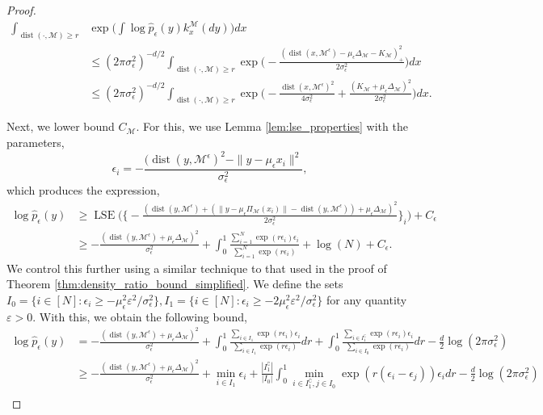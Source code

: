 \documentclass[10pt]{article}
\theoremstyle{plain}
\theoremstyle{definition}
\theoremstyle{remark}
\newcommand{\M}{{\mathcal{M}}}
\newcommand{\lse}{\operatorname{LSE}}
\newcommand{\dist}{\operatorname{dist}}
\newcommand{\gap}{\Delta_\M}
\begin{document}
\begin{proof}
\begin{align}
    \int_{\dist(\cdot, \M) \geq r} & \exp \bigg ( \int \log \hat{p}_\epsilon(y) k_x^\M(dy) \bigg ) dx \nonumber\\
    &\leq (2 \pi \sigma_\epsilon^2)^{-d/2} \int_{\dist(\cdot, \M) \geq r} \exp \bigg ( - \frac{(\dist(x, \M^\epsilon) - \mu_\epsilon \gap - K_\M)_+^2}{2 \sigma_\epsilon^2} \bigg ) dx \nonumber\\
    &\leq (2 \pi \sigma_\epsilon^2)^{-d/2} \int_{\dist(\cdot, \M) \geq r} \exp \bigg ( - \frac{\dist(x, \M^\epsilon)^2}{4\sigma_\epsilon^2} + \frac{(K_\M + \mu_\epsilon \gap)^2}{2\sigma_\epsilon^2} \bigg ) dx.\label{eq:man_conc_simple_5}
\end{align}

Next, we lower bound \(C_\M\). For this, we use Lemma \ref{lem:lse_properties} with the parameters,
\begin{equation*}
    \epsilon_i = -\frac{(\dist(y, \M^\epsilon)^2 - \|y - \mu_\epsilon x_i\|^2}{\sigma_\epsilon^2},
\end{equation*}
which produces the expression,
\begin{align*}
    \log \hat{p}_\epsilon(y) &\geq\lse \bigg ( \bigg \{ - \frac{(\dist(y, \M^\epsilon) + (\|y - \mu_\epsilon \Pi_\M(x_i)\|-\dist(y, \M^\epsilon)) + \mu_\epsilon \gap)^2}{2\sigma_\epsilon^2} \bigg \}_i \bigg ) + C_\epsilon\\
    &\geq -\frac{(\dist(y, \M^\epsilon) + \mu_\epsilon \gap)^2}{\sigma_\epsilon^2} + \int_0^1 \frac{\sum_{i=1}^N\exp(r\epsilon_i)\epsilon_i}{\sum_{i=1}^N \exp(r\epsilon_i)} + \log(N) + C_\epsilon.
\end{align*}
We control this further using a similar technique to that used in the proof of Theorem \ref{thm:density_ratio_bound_simplified}. We define the sets \(I_0 = \{i \in [N]: \epsilon_i \geq -\mu_\epsilon^2 \varepsilon^2/\sigma_\epsilon^2\}, I_1 = \{i \in [N]: \epsilon_i \geq -2\mu_\epsilon^2\varepsilon^2/\sigma_\epsilon^2\}\) for any quantity \(\varepsilon > 0\). With this, we obtain the following bound,
\begin{align*}
    \log \hat{p}_\epsilon(y) &= -\frac{(\dist(y, \M^\epsilon) + \mu_\epsilon \gap)^2}{\sigma_\epsilon^2} + \int_0^1 \frac{\sum_{i \in I_1} \exp(r\epsilon_i)\epsilon_i}{\sum_{i \in I_1} \exp(r\epsilon_i)} dr + \int_0^1 \frac{\sum_{i \in I_1^\complement} \exp(r\epsilon_i)\epsilon_i}{\sum_{i \in I_0} \exp(r\epsilon_i)} dr - \frac{d}{2}\log(2 \pi \sigma_\epsilon^2)\\
    &\geq -\frac{(\dist(y, \M^\epsilon) + \mu_\epsilon \gap)^2}{\sigma_\epsilon^2} + \min_{i \in I_1} \epsilon_i + \frac{|I_1^\complement|}{|I_0|} \int_0^1 \min_{i \in I_1^\complement, j \in I_0}\exp(r(\epsilon_i - \epsilon_j))\epsilon_i dr - \frac{d}{2}\log(2 \pi \sigma_\epsilon^2)\\

\end{align*}
\end{proof}
\end{document}
